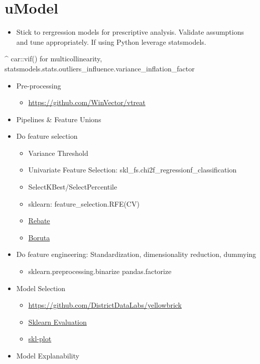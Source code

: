 \documentclass[]{book}
\providecommand{\tightlist}{%
  \setlength{\itemsep}{0pt}\setlength{\parskip}{0pt}}
\theoremstyle{definition}
\theoremstyle{definition}
\theoremstyle{definition}
\theoremstyle{remark}
\begin{document}
\section{uModel}\label{umodel}

\begin{itemize}
\tightlist
\item
  Stick to rergression models for prescriptive analysis. Validate
  assumptions and tune appropriately. If using Python leverage
  statsmodels.
\end{itemize}

\^{} car::vif() for multicollinearity,
statsmodels.stats.outliers\_influence.variance\_inflation\_factor

\begin{itemize}
\item
  Pre-processing

  \begin{itemize}
  \tightlist
  \item
    \url{https://github.com/WinVector/vtreat}
  \end{itemize}
\item
  Pipelines \& Feature Unions
\item
  Do feature selection

  \begin{itemize}
  \tightlist
  \item
    Variance Threshold
  \item
    Univariate Feature Selection:
    skl\_fs.chi2\textbar{}f\_regression\textbar{}f\_classification
  \item
    SelectKBest/SelectPercentile
  \item
    sklearn: feature\_selection.RFE(CV)
  \item
    \href{https://github.com/EpistasisLab/scikit-rebate}{Rebate}
  \item
    \href{https://github.com/scikit-learn-contrib/boruta_py}{Boruta}
  \end{itemize}
\item
  Do feature engineering: Standardization, dimensionality reduction,
  dummying

  \begin{itemize}
  \tightlist
  \item
    sklearn.preprocessing.binarize \textbar{} pandas.factorize
  \end{itemize}
\item
  Model Selection

  \begin{itemize}
  \tightlist
  \item
    \url{https://github.com/DistrictDataLabs/yellowbrick}
  \item
    \href{https://edublancas.github.io/sklearn-evaluation/}{Sklearn
    Evaluation}
  \item
    \href{https://github.com/reiinakano/scikit-plot}{skl-plot}
  \end{itemize}
\item
  Model Explanability


\end{itemize}
\end{document}
